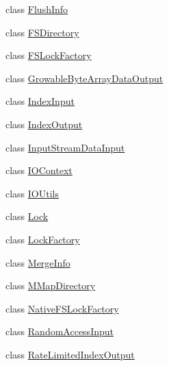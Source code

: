 \begin{DoxyCompactItemize}
\item 
class \mbox{\hyperlink{classlucene_1_1core_1_1store_1_1FlushInfo}{Flush\+Info}}
\item 
class \mbox{\hyperlink{classlucene_1_1core_1_1store_1_1FSDirectory}{F\+S\+Directory}}
\item 
class \mbox{\hyperlink{classlucene_1_1core_1_1store_1_1FSLockFactory}{F\+S\+Lock\+Factory}}
\item 
class \mbox{\hyperlink{classlucene_1_1core_1_1store_1_1GrowableByteArrayDataOutput}{Growable\+Byte\+Array\+Data\+Output}}
\item 
class \mbox{\hyperlink{classlucene_1_1core_1_1store_1_1IndexInput}{Index\+Input}}
\item 
class \mbox{\hyperlink{classlucene_1_1core_1_1store_1_1IndexOutput}{Index\+Output}}
\item 
class \mbox{\hyperlink{classlucene_1_1core_1_1store_1_1InputStreamDataInput}{Input\+Stream\+Data\+Input}}
\item 
class \mbox{\hyperlink{classlucene_1_1core_1_1store_1_1IOContext}{I\+O\+Context}}
\item 
class \mbox{\hyperlink{classlucene_1_1core_1_1store_1_1IOUtils}{I\+O\+Utils}}
\item 
class \mbox{\hyperlink{classlucene_1_1core_1_1store_1_1Lock}{Lock}}
\item 
class \mbox{\hyperlink{classlucene_1_1core_1_1store_1_1LockFactory}{Lock\+Factory}}
\item 
class \mbox{\hyperlink{classlucene_1_1core_1_1store_1_1MergeInfo}{Merge\+Info}}
\item 
class \mbox{\hyperlink{classlucene_1_1core_1_1store_1_1MMapDirectory}{M\+Map\+Directory}}
\item 
class \mbox{\hyperlink{classlucene_1_1core_1_1store_1_1NativeFSLockFactory}{Native\+F\+S\+Lock\+Factory}}
\item 
class \mbox{\hyperlink{classlucene_1_1core_1_1store_1_1RandomAccessInput}{Random\+Access\+Input}}
\item 
class \mbox{\hyperlink{classlucene_1_1core_1_1store_1_1RateLimitedIndexOutput}{Rate\+Limited\+Index\+Output}}
\end{DoxyCompactItemize}
